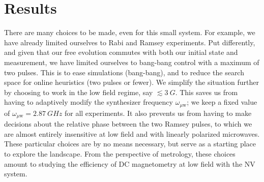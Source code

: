 \documentclass[aps,nofootinbib,twocolumn,superscriptaddress]{revtex4}
\newcommand{\uw}{{\mu\text{w}}}
\begin{document}
\section{Results}
\label{sec:results}

There are many choices to be made, even for this small system.
For example, we have already limited ourselves to Rabi and 
Ramsey experiments.
Put differently, and given that our free evolution commutes with 
both our initial state and measurement, 
we have limited ourselves to bang-bang control
with a maximum of two pulses.
This is to ease simulations (bang-bang), and to reduce the
search space for online heuristics (two pulses or fewer).
We simplify the situation further by choosing to work in the low field
regime, say $\lesssim\SI{3}{G}$.
This saves us from having to adaptively modify the synthesizer 
frequency $\omega_\uw$; we keep a fixed value of 
$\omega_\uw=\SI{2.87}{GHz}$ for all experiments.
It also
prevents us from having to make decisions about the relative
phase between the two Ramsey pulses, to which we are
almost entirely insensitive at low field and with linearly
polarized microwaves.
These particular choices are by no means necessary, but serve
as a starting place to explore the landscape.
From the perspective of metrology, these choices amount to studying
the efficiency of DC magnetometry at low field with the NV system.
\end{document}
